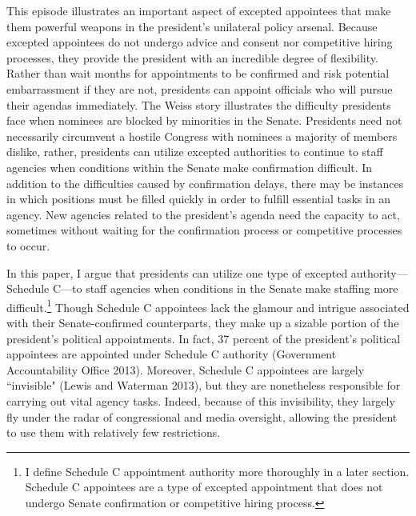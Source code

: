 \documentclass[12pt]{article}
\begin{document}
	This episode illustrates an important aspect of excepted appointees that make them powerful weapons in the president's unilateral policy arsenal. Because excepted appointees do not undergo advice and consent nor competitive hiring processes, they provide the president with an incredible degree of flexibility. Rather than wait months for appointments to be confirmed and risk potential embarrassment if they are not, presidents can appoint officials who will pursue their agendas immediately. The Weiss story illustrates the difficulty presidents face when nominees are blocked by minorities in the Senate. Presidents need not necessarily circumvent a hostile Congress with nominees a majority of members dislike, rather, presidents can utilize excepted authorities to continue to staff agencies when conditions within the Senate make confirmation difficult. In addition to the difficulties caused by confirmation delays, there may be instances in which positions must be filled quickly in order to fulfill essential tasks in an agency. New agencies related to the president's agenda need the capacity to act, sometimes without waiting for the confirmation process or competitive processes to occur. 
	
	In this paper, I argue that presidents can utilize one type of excepted authority---Schedule C---to staff agencies when conditions in the Senate make staffing more difficult.\footnote{I define Schedule C appointment authority more thoroughly in a later section. Schedule C appointees are a type of excepted appointment that does not undergo Senate confirmation or competitive hiring process.} Though Schedule C appointees lack the glamour and intrigue associated with their Senate-confirmed counterparts, they make up a sizable portion of the president's political appointments. In fact, 37 percent of the president's political appointees are appointed under Schedule C authority (Government Accountability Office 2013). Moreover, Schedule C appointees are largely ``invisible" (Lewis and Waterman 2013), but they are nonetheless responsible for carrying out vital agency tasks. Indeed, because of this invisibility, they largely fly under the radar of congressional and media oversight, allowing the president to use them with relatively few restrictions.
	
\end{document}
